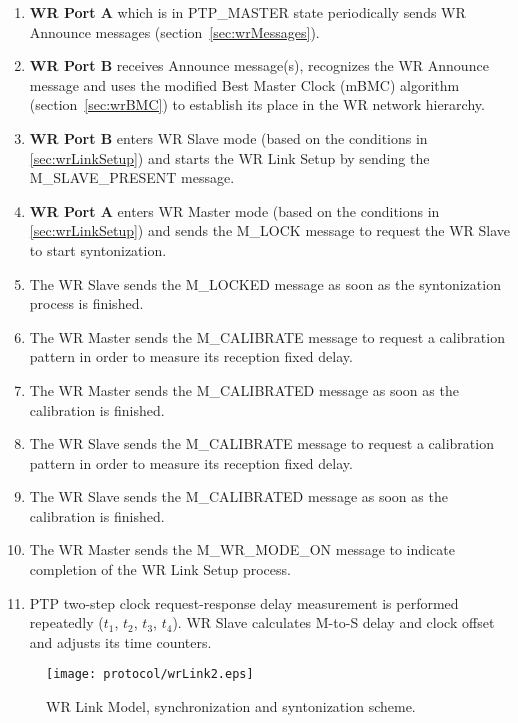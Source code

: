 \begin{enumerate}
\item \textbf{WR Port A} which is in PTP\_MASTER state periodically sends WR Announce messages
      (section~\ref{sec:wrMessages}).
\item \textbf{WR Port B} receives Announce message(s), recognizes the WR Announce message and 
      uses the modified Best Master Clock (mBMC) algorithm (section~\ref{sec:wrBMC}) to establish its
      place in the WR network hierarchy.
\item \textbf{WR Port B} enters WR Slave mode (based on the conditions in 
      \ref{sec:wrLinkSetup}) and starts the WR Link Setup by sending the M\_SLAVE\_PRESENT message.
\item \textbf{WR Port A} enters WR Master mode (based on the conditions in 
      \ref{sec:wrLinkSetup}) and sends the M\_LOCK message to request the WR Slave to start
      syntonization.
\item The WR Slave sends the M\_LOCKED message as soon as the syntonization process is 
      finished.
\item The WR Master sends the M\_CALIBRATE message to request a calibration pattern in order to 
      measure its reception fixed delay.
\item The WR Master sends the M\_CALIBRATED message as soon as the calibration is 
      finished.
\item The WR Slave sends the M\_CALIBRATE message to request a calibration pattern in order to 
      measure its reception fixed delay.
\item The WR Slave sends the M\_CALIBRATED message as soon as the calibration is 
      finished.
\item The WR Master sends the M\_WR\_MODE\_ON message to indicate completion of  the WR
      Link Setup process.
\item PTP two-step clock request-response delay measurement is performed repeatedly ($t_{1}$,
      $t_{2}$, $t_{3}$, $t_{4}$). WR Slave calculates M-to-S delay and clock offset and adjusts its
      time counters.
\end{enumerate}


\begin{figure}[!t]
\centering
\texttt{[image: protocol/wrLink2.eps]}
\caption{WR Link  Model, synchronization and syntonization scheme.}
\label{fig:wrLink}
\end{figure}



